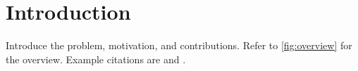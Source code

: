 \section{Introduction}
\label{sec:introduction}
Introduce the problem, motivation, and contributions. Refer to
\cref{fig:overview} for the overview. Example citations are
\citet{knuth1984texbook} and \citep{lamport1994latex}.
